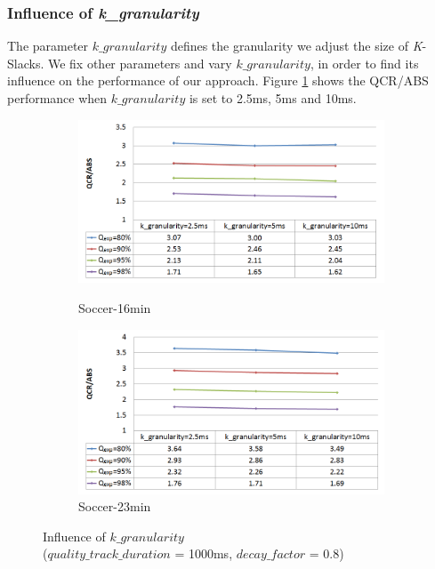 \documentclass[a4paper, 11pt, twoside]{report}
\begin{document}
\clearpage

\subsubsection{Influence of \textit{k\_granularity}}
\label{subsec:influence-k-granularity}

The parameter $k\_granularity$ defines the granularity we adjust the size of \textit{K}-Slacks. We fix other parameters and vary $k\_granularity$, in order to find its influence on the performance of our approach. Figure \ref{fig:influence-k-granularity} shows the QCR/ABS performance when  $k\_granularity$ is set to 2.5ms, 5ms and 10ms.\\

\begin{figure}[H]
	\centering
	\begin{subfigure}[t]{5in}
		\centering
		\includegraphics[width=5in]{influence-k-granularity-16min}
		\caption{Soccer-16min}
		\hspace{5pt}
		\includegraphics[width=5in]{influence-k-granularity-23min}
		\caption{Soccer-23min}	
	\end{subfigure}
	\caption{Influence of $k\_granularity$ \protect\\ ($quality\_track\_duration$ = 1000ms, $decay\_factor$ = 0.8)}
	\label{fig:influence-k-granularity}
\end{figure}
\end{document}
